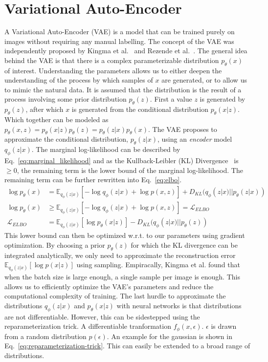\section{Variational Auto-Encoder}
A Variational Auto-Encoder (VAE) is a model that can be trained purely on images without requiring any manual labelling. The concept of the VAE was independently proposed by Kingma et al.~\cite{kingma2014autoencodingvariationalbayes} and Rezende et al.~\cite{rezende2014stochastic}. The general idea behind the VAE is that there is a complex parameterizable distribution $p_\theta(x)$ of interest. Understanding the parameters allows us to either deepen the understanding of the process by which samples of $x$ are generated, or to allow us to mimic the natural data. It is assumed that the distribution is the result of a process involving some prior distribution $p_\theta(z)$. First a value $z$ is generated by $p_\theta(z)$, after which $x$ is generated from the conditional distribution $p_\theta(x | z)$. Which together can be modeled as $p_\theta(x, z) = p_\theta(x|z)p_\theta(z) = p_\theta(z|x)p_\theta(x)$. The VAE proposes to approximate the conditional distribution, $p_\theta(z|x)$, using an \emph{encoder} model $q_\phi(z|x)$. The marginal log-likelihood can be described by Eq.~\ref{eq:marginal_likelihood} and as the Kullback-Leibler (KL) Divergence~\cite{kullback1951information} is $\geq 0$, the remaining term is the lower bound of the marginal log-likelihood. The remaining term can be further rewritten into Eq.~\ref{eq:elbo}.
\begin{subequations}
    \begin{align}
        \log p_\theta(x)   & = \mathbb{E}_{q_{\phi}(z|x)}[-\log q_\phi(z|x) + \log p(x,z)] + D_{KL}(q_{\phi}(z|x) || p_\theta(z|x))\label{eq:marginal_likelihood} \\
        \log p_\theta(x)   & \geq \mathbb{E}_{q_{\phi}(z|x)}[-\log q_\phi(z|x) + \log p(x,z)] = \mathcal{L}_{ELBO}                                                \\
        \mathcal{L}_{ELBO} & = \mathbb{E}_{q_{\phi}(z|x)}[\log p_\theta(x|z)] - D_{KL}(q_{\phi}(z|x) || p_\theta(z))\label{eq:elbo}
    \end{align}
\end{subequations}
This lower bound can then be optimized w.r.t. to our parameters using gradient optimization. By choosing a prior $p_\theta(z)$ for which the KL divergence can be integrated analytically, we only need to approximate the reconstruction error $\mathbb{E}_{q_{\phi}(z|x)}[\log p(x|z)]$ using sampling. Empiracally, Kingma et al. found that when the batch size is large enough, a single sample per image is enough. This allows us to efficiently optimize the VAE's parameters and reduce the computational complexity of training. The last hurdle to approximate the distributions $q_{\phi}(z | x)$ and $p_{\theta}(x | z)$ with neural networks is that distributions are not differentiable. However, this can be sidestepped using the reparameterization trick. A differentiable tranformation $f_\phi(x, \epsilon)$. $\epsilon$ is drawn from a random distribution $p(\epsilon)$. An example for the gaussian is shown in Eq.~\ref{eq:reparameterization-trick}. This can easily be extended to a broad range of distributions.
